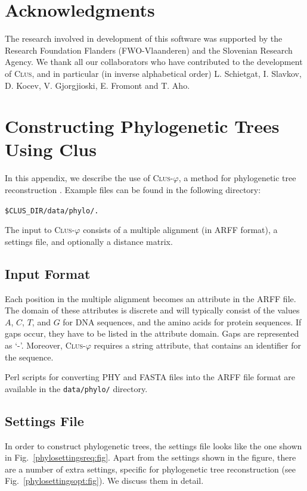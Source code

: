 \documentclass[a4paper]{report}
\newcommand{\clus}{\textsc{Clus}}
\newcommand{\clusphy}{\textsc{Clus}-$\varphi$}
\begin{document}
\chapter*{Acknowledgments}
The research involved in development of this software was supported by the Research Foundation Flanders (FWO-Vlaanderen) and the Slovenian Research Agency. We thank all our collaborators who have contributed to the development of \clus{}, and in particular (in inverse alphabetical order) L. Schietgat, I. Slavkov, D. Kocev, V. Gjorgjioski, E. Fromont and T. Aho.

\appendix
\chapter{Constructing Phylogenetic Trees Using Clus}

In this appendix, we describe the use of \clusphy{}, a method for phylogenetic tree reconstruction \cite{Vens10:proc}.
Example files can be found in the following directory:  
\begin{flushleft}
\verb^$CLUS_DIR/data/phylo/.^
\end{flushleft}

The input to \clusphy{} consists of a multiple alignment (in ARFF format), a settings file, and optionally a distance matrix.

\section{Input Format}
Each position in the multiple alignment becomes an attribute in the ARFF file. The domain of these attributes is discrete and will typically consist of the values $A$, $C$, $T$, and $G$ for DNA sequences, and the amino acids for protein sequences. If gaps occur, they have to be listed in the attribute domain. Gaps are represented as `-'.
Moreover, \clusphy{} requires a string attribute, that contains an identifier for the sequence.

Perl scripts for converting PHY and FASTA files into the ARFF file format are available in the {\tt data/phylo/} directory.

\section{Settings File}
In order to construct phylogenetic trees, the settings file looks like the one shown in Fig.~\ref{phylosettingsreq:fig}. Apart from the settings shown in the figure, there are a number of extra settings, specific for phylogenetic tree reconstruction (see Fig.~\ref{phylosettingsopt:fig}). We discuss them in detail.
\end{document}

